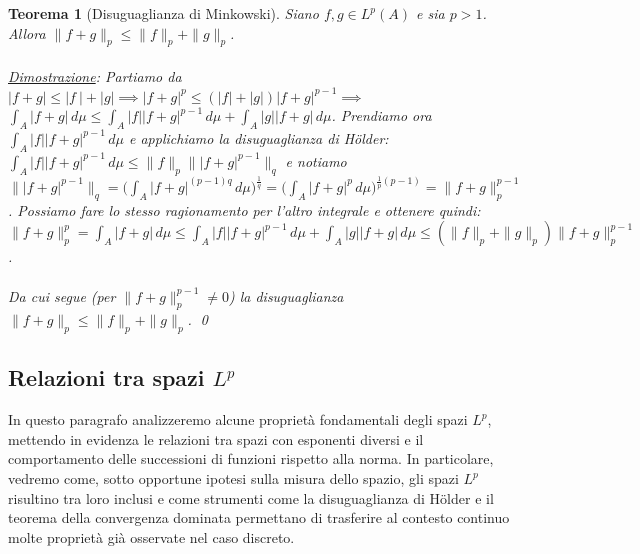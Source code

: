 \documentclass[a4paper,12pt]{report}
\newtheorem{teorema}{Teorema}[chapter]
\newcommand{\gt}{>}
\begin{document}
\begin{teorema}[Disuguaglianza di Minkowski]
    Siano $f,g \in L^p(A)$ e sia $p\gt 1$. 
    \\Allora $\|f+g\|_p\leq\|f\|_p+\|g\|_p$.
    \\
    \\ \underline{Dimostrazione}: Partiamo da $|f+g|\leq |f\ |+|g| \implies |f+g|^p\leq (|f|+|g|)|f+g|^{p-1} \implies$
    \\ $\displaystyle\int_A|f+g|\,d\mu\leq\int_A|f||f+g|^{p-1}\,d\mu+\int_A|g||f+g|\,d\mu$. Prendiamo ora $\displaystyle\int_A|f||f+g|^{p-1}\,d\mu$ e applichiamo la disuguaglianza di Hölder: $\displaystyle\int_A|f||f+g|^{p-1}\,d\mu\leq\|f\|_p\||f+g|^{p-1}\|_q$ e notiamo $\|  |f+g| ^{p-1}\|_q=\bigg(\displaystyle\int_A|f+g|^{(p-1)q}\,d\mu\bigg)^\frac{1}{q}=\bigg(\int_A|f+g|^p\,d\mu\bigg)^{\frac{1}{p}(p-1)}=\|f+g\|_p^{p-1}$. Possiamo fare lo stesso ragionamento per l'altro integrale e ottenere quindi:
    \\ $\|f+g\|_p^p=\displaystyle\int_A|f+g|\,d\mu\leq\int_A|f||f+g|^{p-1}\,d\mu+\int_A|g||f+g|\,d\mu\leq (\|f\|_p+\|g\|_p)\|f+g\|_p^{p-1}$. 
    \\
    \\Da cui segue (per $\|f+g\|_p^{p-1}\neq 0$) la disuguaglianza $\|f+g\|_p\leq \|f\|_p+\|g\|_p$. \qed
\end{teorema}

\subsection{Relazioni tra spazi $L^p$}

In questo paragrafo analizzeremo alcune proprietà fondamentali degli spazi $L^p$, mettendo in evidenza le relazioni tra spazi con esponenti diversi e il comportamento delle successioni di funzioni rispetto alla norma. In particolare, vedremo come, sotto opportune ipotesi sulla misura dello spazio, gli spazi $L^p$ risultino tra loro inclusi e come strumenti come la disuguaglianza di Hölder e il teorema della convergenza dominata permettano di trasferire al contesto continuo molte proprietà già osservate nel caso discreto.
\end{document}
